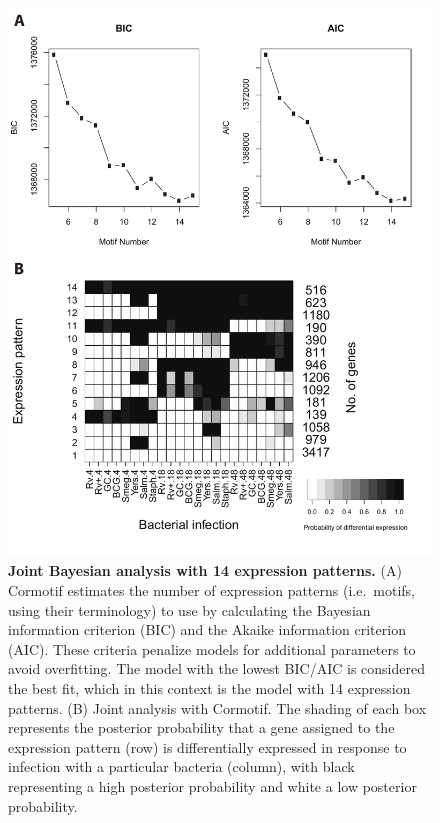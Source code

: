 \begin{figure}[htbp]
\centering
\includegraphics[width=5in]{img/ch02/fig-S03-joint-all-k14.pdf}
\caption[Joint Bayesian analysis with 14 expression
  patterns.]{\textbf{Joint Bayesian analysis with 14 expression
    patterns.} (A) Cormotif \citep{Wei2015} estimates the number of
  expression patterns (i.e.~motifs, using their terminology) to use by
  calculating the Bayesian information criterion (BIC) and the Akaike
  information criterion (AIC). These criteria penalize models for
  additional parameters to avoid overfitting. The model with the
  lowest BIC/AIC is considered the best fit, which in this context is
  the model with 14 expression patterns. (B) Joint analysis with
  Cormotif. The shading of each box represents the posterior
  probability that a gene assigned to the expression pattern (row) is
  differentially expressed in response to infection with a particular
  bacteria (column), with black representing a high posterior
  probability and white a low posterior probability.}
\label{fig:joint-all-k14}
\end{figure}

